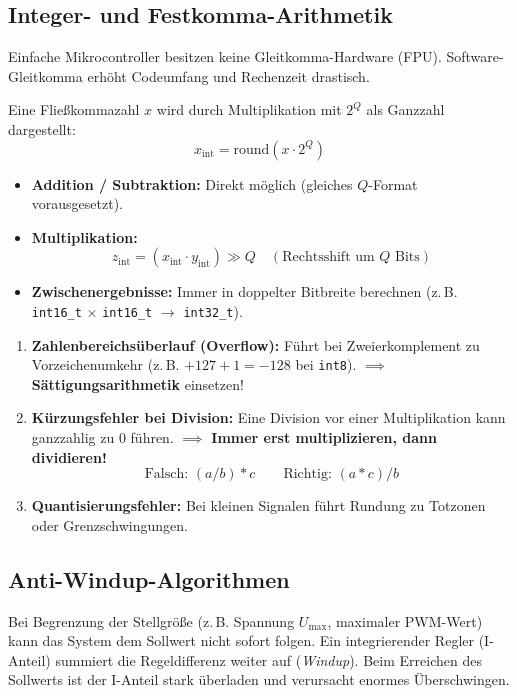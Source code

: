 \subsection{Integer- und Festkomma-Arithmetik}
\begin{tcolorbox}
Einfache Mikrocontroller besitzen keine Gleitkomma-Hardware (FPU). Software-Gleitkomma erhöht Codeumfang und Rechenzeit drastisch.
\end{tcolorbox}

\begin{tcolorbox}
Eine Fließkommazahl $x$ wird durch Multiplikation mit $2^Q$ als Ganzzahl dargestellt:
\[
x_{\text{int}} = \text{round}(x \cdot 2^Q)
\]
\begin{itemize}
  \item \textbf{Addition / Subtraktion:} Direkt möglich (gleiches $Q$-Format vorausgesetzt).
  \item \textbf{Multiplikation:}
  \[
  z_{\text{int}} = (x_{\text{int}} \cdot y_{\text{int}}) \gg Q \quad (\text{Rechtsshift um } Q \text{ Bits})
  \]
  \item \textbf{Zwischenergebnisse:} Immer in doppelter Bitbreite berechnen (z.\,B. \texttt{int16\_t} $\times$ \texttt{int16\_t} $\to$ \texttt{int32\_t}).
\end{itemize}
\end{tcolorbox}

\begin{tcolorbox}
\begin{enumerate}
  \item \textbf{Zahlenbereichsüberlauf (Overflow):}
  Führt bei Zweierkomplement zu Vorzeichenumkehr (z.\,B. $+127 + 1 = -128$ bei \texttt{int8}). $\implies$ \textbf{Sättigungsarithmetik} einsetzen!
  \item \textbf{Kürzungsfehler bei Division:}
  Eine Division vor einer Multiplikation kann ganzzahlig zu 0 führen. $\implies$ \textbf{Immer erst multiplizieren, dann dividieren!}
  \[
  \text{Falsch: } (a / b) * c \qquad \text{Richtig: } (a * c) / b
  \]
  \item \textbf{Quantisierungsfehler:} Bei kleinen Signalen führt Rundung zu Totzonen oder Grenzschwingungen.
\end{enumerate}
\end{tcolorbox}

\subsection{Anti-Windup-Algorithmen}
\begin{tcolorbox}
Bei Begrenzung der Stellgröße (z.\,B. Spannung $U_{\max}$, maximaler PWM-Wert) kann das System dem Sollwert nicht sofort folgen. Ein integrierender Regler (I-Anteil) summiert die Regeldifferenz weiter auf (\textit{Windup}). Beim Erreichen des Sollwerts ist der I-Anteil stark überladen und verursacht enormes Überschwingen.
\end{tcolorbox}


